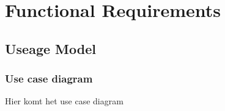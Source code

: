 \chapter{Functional Requirements}
\section{Useage Model}

\subsection{Use case diagram}

Hier komt het use case diagram